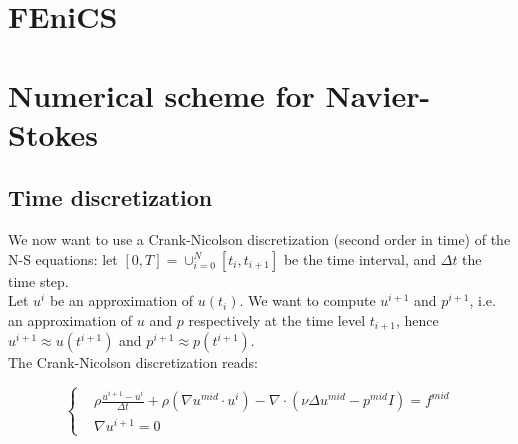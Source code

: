 \documentclass[11pt,a4paper,titlepage]{report}
\begin{document}
%
%
%
%
%
%







\section{FEniCS}

\section{Numerical scheme for Navier-Stokes}

\subsection{Time discretization}
We now want to use a Crank-Nicolson discretization (second order in time) of the N-S equations: let $[0, T] = \cup^N_{i=0} [t_i, t_{i+1}] $ be the time interval, and $\Delta t$ the time step. \\
Let $u^i$ be an approximation of $u(t_i)$. We want to compute $u^{i+1}$ and $p^{i+1}$, i.e. an approximation of $u$ and $p$ respectively at the time level $t_{i+1}$, hence $u^{i+1} \approx u(t^{i+1})$ and $p^{i+1} \approx p(t^{i+1})$. \\
The Crank-Nicolson discretization reads:

\[
\left\{
\begin{aligned}
& \rho \frac{u^{i+1} - u^i}{\Delta t} + \rho (\nabla u^{mid} \cdot u^i) - \nabla \cdot (\nu \Delta u^{mid} - p^{mid}I) = f^{mid} \\
& \nabla u^{i+1} = 0
\end{aligned}
\right.
\]
\end{document}
